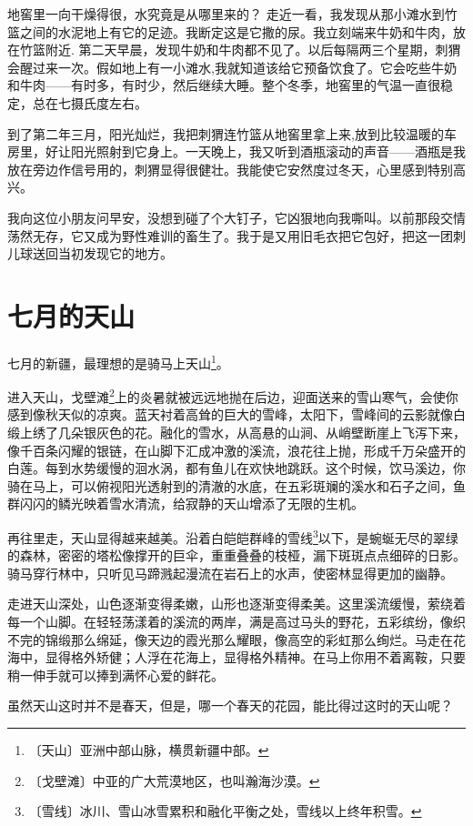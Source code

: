 \documentclass[12pt,UTF-8,openany]{ctexbook}
\begin{document}
\begin{large}
    地窖里一向干燥得很，水究竟是从哪里来的？ 走近一看，我发现从那小滩水到竹篮之间的水泥地上有它的足迹。我断定这是它撒的尿。我立刻端来牛奶和牛肉，放在竹篮附近. 第二天早晨，发现牛奶和牛肉都不见了。以后每隔两三个星期，刺猬会醒过来一次。假如地上有一小滩水,我就知道该给它预备饮食了。它会吃些牛奶和牛肉——有时多，有时少，然后继续大睡。整个冬季，地窖里的气温一直很稳定，总在七摄氏度左右。
    
    到了第二年三月，阳光灿烂，我把刺猬连竹篮从地窖里拿上来,放到比较温暖的车房里，好让阳光照射到它身上。一天晚上，我又听到酒瓶滚动的声音——酒瓶是我放在旁边作信号用的，刺猬显得很健壮。我能使它安然度过冬天，心里感到特别高兴。
    
    我向这位小朋友问早安，没想到碰了个大钉子，它凶狠地向我嘶叫。以前那段交情荡然无存，它又成为野性难训的畜生了。我于是又用旧毛衣把它包好，把这一团刺儿球送回当初发现它的地方。
    
\end{large}



\chapter{七月的天山}

\begin{large}
    
    七月的新疆，最理想的是骑马上天山\footnote{〔天山〕亚洲中部山脉，横贯新疆中部。}。
    
    进入天山，戈壁滩\footnote{〔戈壁滩〕中亚的广大荒漠地区，也叫瀚海沙漠。}上的炎暑就被远远地抛在后边，迎面送来的雪山寒气，会使你感到像秋天似的凉爽。蓝天衬着高耸的巨大的雪峰，太阳下，雪峰间的云影就像白缎上绣了几朵银灰色的花。融化的雪水，从高悬的山涧、从峭壁断崖上飞泻下来，像千百条闪耀的银链，在山脚下汇成冲激的溪流，浪花往上抛，形成千万朵盛开的白莲。每到水势缓慢的洄水涡，都有鱼儿在欢快地跳跃。这个时候，饮马溪边，你骑在马上，可以俯视阳光透射到的清澈的水底，在五彩斑斓的溪水和石子之间，鱼群闪闪的鳞光映着雪水清流，给寂静的天山增添了无限的生机。
    
    再往里走，天山显得越来越美。沿着白皑皑群峰的雪线\footnote{〔雪线〕冰川、雪山冰雪累积和融化平衡之处，雪线以上终年积雪。}以下，是蜿蜒无尽的翠绿的森林，密密的塔松像撑开的巨伞，重重叠叠的枝桠，漏下斑斑点点细碎的日影。骑马穿行林中，只听见马蹄溅起漫流在岩石上的水声，使密林显得更加的幽静。
    
    走进天山深处，山色逐渐变得柔嫩，山形也逐渐变得柔美。这里溪流缓慢，萦绕着每一个山脚。在轻轻荡漾着的溪流的两岸，满是高过马头的野花，五彩缤纷，像织不完的锦缎那么绵延，像天边的霞光那么耀眼，像高空的彩虹那么绚烂。马走在花海中，显得格外矫健；人浮在花海上，显得格外精神。在马上你用不着离鞍，只要稍一伸手就可以捧到满怀心爱的鲜花。
    
    虽然天山这时并不是春天，但是，哪一个春天的花园，能比得过这时的天山呢？
    
\end{large}
\end{document}
